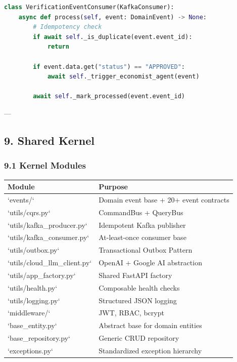 \documentclass[11pt,a4paper]{article}
\begin{document}
\begin{lstlisting}[language=python, caption=python code]
class VerificationEventConsumer(KafkaConsumer):
    async def process(self, event: DomainEvent) -> None:
        # Idempotency check
        if await self._is_duplicate(event.event_id):
            return
        
        if event.data.get("status") == "APPROVED":
            await self._trigger_economist_agent(event)
        
        await self._mark_processed(event.event_id)
\end{lstlisting}

---

\subsection{9. Shared Kernel}


\subsubsection{9.1 Kernel Modules}

\begin{table}[H]
\centering
\begin{tabular}{|l|l|}
\hline
Module & Purpose \\
\hline
`events/` & Domain event base + 20+ event contracts \\
\hline
`utils/cqrs.py` & CommandBus + QueryBus \\
\hline
`utils/kafka_producer.py` & Idempotent Kafka publisher \\
\hline
`utils/kafka_consumer.py` & At-least-once consumer base \\
\hline
`utils/outbox.py` & Transactional Outbox Pattern \\
\hline
`utils/cloud_llm_client.py` & OpenAI + Google AI abstraction \\
\hline
`utils/app_factory.py` & Shared FastAPI factory \\
\hline
`utils/health.py` & Composable health checks \\
\hline
`utils/logging.py` & Structured JSON logging \\
\hline
`middleware/` & JWT, RBAC, bcrypt \\
\hline
`base_entity.py` & Abstract base for domain entities \\
\hline
`base_repository.py` & Generic CRUD repository \\
\hline
`exceptions.py` & Standardized exception hierarchy \\
\hline
\end{tabular}
\end{table}
\end{document}
